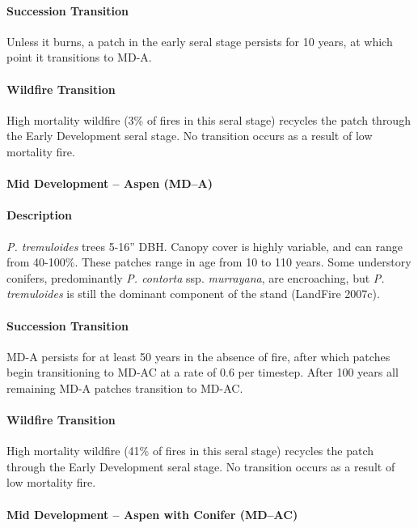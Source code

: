 \paragraph{Succession Transition} Unless it burns, a patch in the early seral stage persists for 10 years, at which point it transitions to MD-A.

\paragraph{Wildfire Transition} High mortality wildfire (3\% of fires in this seral stage) recycles the patch through the Early Development seral stage. No transition occurs as a result of low mortality fire.

\noindent\hrulefill


\paragraph{Mid Development – Aspen (MD–A)}

\paragraph{Description} \emph{P. tremuloides} trees 5-16'' DBH. Canopy cover is highly variable, and can range from 40-100\%. These patches range in age from 10 to 110 years. Some understory conifers, predominantly \emph{P. contorta} ssp. \emph{murrayana}, are encroaching, but \emph{P. tremuloides} is still the dominant component of the stand (LandFire 2007c).

\paragraph{Succession Transition} MD-A persists for at least 50 years in the absence of fire, after which patches begin transitioning to MD-AC at a rate of 0.6 per timestep. After 100 years all remaining MD-A patches transition to MD-AC. 

\paragraph{Wildfire Transition} High mortality wildfire (41\% of fires in this seral stage) recycles the patch through the Early Development seral stage. No transition occurs as a result of low mortality fire.

\noindent\hrulefill

\paragraph{Mid Development – Aspen with Conifer (MD–AC)}

